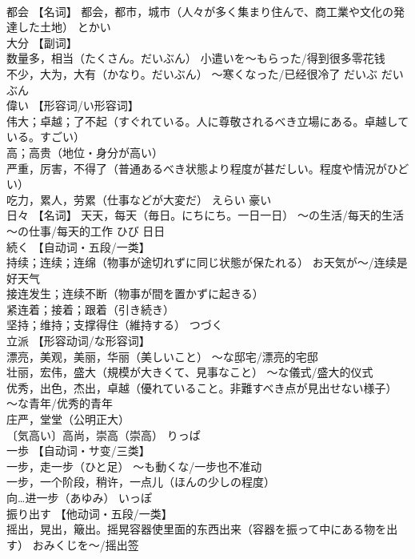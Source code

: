 \documentclass[8pt]{extreport}
\begin{document}
\begin{CJK}{UTF8}{min}
\\	都会	【名词】 都会，都市，城市（人々が多く集まり住んで、商工業や文化の発達した土地）	とかい	
\\	大分	【副词】 
\\	数量多，相当（たくさん。だいぶん） 小遣いを～もらった/得到很多零花钱 
\\	不少，大为，大有（かなり。だいぶん） ～寒くなった/已经很冷了	だいぶ だいぶん	
\\	偉い	【形容词/い形容词】 
\\	伟大；卓越；了不起（すぐれている。人に尊敬されるべき立場にある。卓越している。すごい） 
\\	高；高贵（地位・身分が高い） 
\\	严重，厉害，不得了（普通あるべき状態より程度が甚だしい。程度や情況がひどい） 
\\	吃力，累人，劳累（仕事などが大変だ）	えらい	豪い
\\	日々	【名词】 天天，每天（毎日。にちにち。一日一日） ～の生活/每天的生活 ～の仕事/每天的工作	ひび	日日
\\	続く	【自动词・五段/一类】 
\\	持续；连续；连绵（物事が途切れずに同じ状態が保たれる） お天気が～/连续是好天气 
\\	接连发生；连续不断（物事が間を置かずに起きる） 
\\	紧连着；接着；跟着（引き続き） 
\\	坚持；维持；支撑得住（維持する）	つづく	
\\	立派	【形容动词/な形容词】 
\\	漂亮，美观，美丽，华丽（美しいこと） ～な邸宅/漂亮的宅邸 
\\	壮丽，宏伟，盛大（規模が大きくて、見事なこと） ～な儀式/盛大的仪式 
\\	优秀，出色，杰出，卓越（優れていること。非難すべき点が見出せない様子） ～な青年/优秀的青年 
\\	庄严，堂堂（公明正大） 
\\	〔気高い〕高尚，崇高（崇高）	りっぱ	
\\	一歩	【自动词・サ变/三类】 
\\	一步，走一步（ひと足） ～も動くな/一步也不准动 
\\	一步，一个阶段，稍许，一点儿（ほんの少しの程度） 
\\	向…进一步（あゆみ）	いっぽ	
\\	振り出す	【他动词・五段/一类】 
\\	摇出，晃出，簸出。摇晃容器使里面的东西出来（容器を振って中にある物を出す） おみくじを～/摇出签 

\end{CJK}
\end{document}
